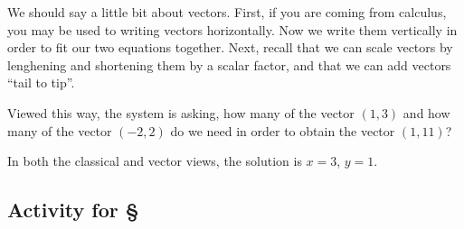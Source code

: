 \documentclass[11pt,oneside]{amsbook}
\theoremstyle{definition}
\theoremstyle{plain}
\theoremstyle{definition}
\theoremstyle{remark}
\numberwithin{equation}{section}
\numberwithin{figure}{section}
\begin{document}
We should say a little bit about vectors. First, if you are coming from calculus, you may be used to writing vectors horizontally. Now we write them vertically in order to fit our two equations together. Next, recall that we can scale vectors by lenghening and shortening them by a scalar factor, and that we can add vectors ``tail to tip''.

Viewed this way, the system is asking, how many of the vector $(1,3)$ and how many of the vector $(-2,2)$ do we need in order to obtain the vector $(1,11)$?

\begin{center}
\end{center}

In both the classical and vector views, the solution is $x=3$, $y=1$.


\newpage
\subsection*{Activity for \S \thesection}
\end{document}

